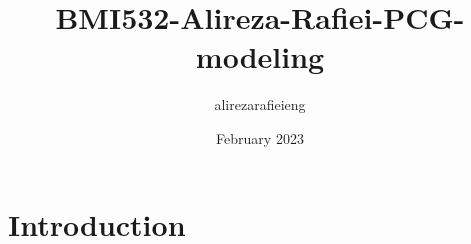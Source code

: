\documentclass{article}
\title{BMI532-Alireza-Rafiei-PCG-modeling}
\author{alirezarafieieng }
\date{February 2023}
\begin{document}
\maketitle

\section{Introduction}
\end{document}
